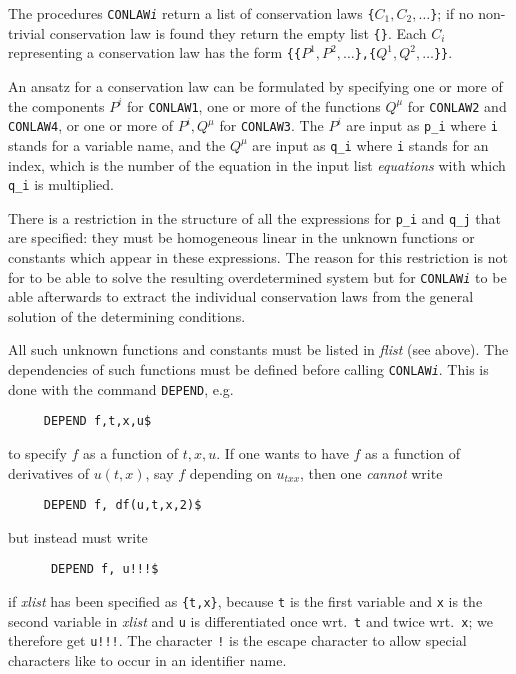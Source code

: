 The procedures \texttt{CONLAW\textit{i}} return a list of conservation
laws \texttt{\{$C_1,C_2,\ldots$\}}; if no non-trivial conservation law
is found they return the empty list \texttt{\{\}}.  Each $C_i$
representing a conservation law has the form
\texttt{\{\{$P^1,P^2,\ldots$\},\{$Q^1,Q^2,\ldots$\}\}}.

An ansatz for a conservation law can be formulated by specifying one
or more of the components $P^i$ for \texttt{CONLAW1}, one or more of
the functions $Q^{\mu}$ for \texttt{CONLAW2} and \texttt{CONLAW4}, or
one or more of $P^i, Q^{\mu}$ for \texttt{CONLAW3}.  The $P^i$ are
input as \texttt{p\_i} where \texttt{i} stands for a variable name,
and the $Q^{\mu}$ are input as \texttt{q\_i} where \texttt{i} stands
for an index, which is the number of the equation in the input list
\textit{equations} with which \texttt{q\_i} is multiplied.

There is a restriction in the structure of all the expressions for
\texttt{p\_i} and \texttt{q\_j} that are specified: they must be
homogeneous linear in the unknown functions or constants which appear
in these expressions.  The reason for this restriction is not for
 to be able to solve the resulting overdetermined
system but for \texttt{CONLAW\textit{i}} to be able afterwards to
extract the individual conservation laws from the general solution of
the determining conditions.

All such unknown functions and constants must be listed in
\textit{flist} (see above).  The dependencies of such functions must
be defined before calling \texttt{CONLAW\textit{i}}.  This is done
with the command \texttt{DEPEND}, e.g.
\begin{verbatim}
     DEPEND f,t,x,u$
\end{verbatim}
to specify $f$ as a function of $t,x,u$.  If one wants to have $f$ as
a function of derivatives of $u(t,x)$, say $f$ depending on $u_{txx}$,
then one \emph{cannot} write
\begin{verbatim}
     DEPEND f, df(u,t,x,2)$
\end{verbatim}
but instead must write
\begin{flushleft}\tt
~~~~~DEPEND f, u!!!\$
\end{flushleft}
if \textit{xlist} has been specified as \texttt{\{t,x\}}, because
\texttt{t} is the first variable and \texttt{x} is the second variable
in \textit{xlist} and \texttt{u} is differentiated once
wrt.\ \texttt{t} and twice wrt.\ \texttt{x}; we therefore get
\texttt{u!!!}.  The
character \texttt{!} is the escape character to allow special
characters like \textasciigrave{} to occur in an identifier name.

